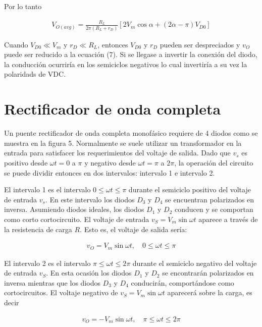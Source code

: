 \documentclass{article}
\begin{document}
Por lo tanto

\begin{align}
	V_{O(avg)} = \frac{R_L}{2\pi (R_L + r_D)} \left[ 2V_m \cos \alpha + (2\alpha - \pi)V_{D0} \right]
\end{align}

Cuando $V_{D0} \ll V_m$ y $r_D \ll R_L$, entonces $V_{D0}$ y $r_D$ pueden ser despreciados y $v_O$ puede ser reducido a la ecuación (7). Si se llegase a invertir la conexión del diodo, la conducción ocurriría en los semiciclos negativos lo cual invertiría a su vez la polaridads de VDC.

\section*{Rectificador de onda completa}
Un puente rectificador de onda completa monofásico requiere de 4 diodos como se muestra en la figura 5. Normalmente se suele utilizar un transformador en la entrada para satisfacer los requerimientos del voltaje de salida. Dado que $v_s$ es positivo desde $\omega t = 0$ a $\pi$ y negativo desde $\omega t = \pi$ a $2\pi$, la operación del circuito se puede dividir entonces en dos intervalos: intervalo 1 e intervalo 2.

El intervalo 1 es el intervalo $0 \leq \omega t \leq \pi$ durante el semiciclo positivo del voltaje de entrada $v_s$. En este intervalo los diodos $D_3$ y  $D_4$ se encuentran polarizados en inversa. Asumiendo diodos ideales, los diodos $D_1$ y $D_2$ conducen y se comportan como corto cortocircuito. El voltaje de entrada $v_S = V_m \sin \omega t$ aparece a través de la resistencia de carga $R$. Esto es, el voltaje de salida sería:

\begin{align}
	v_O = V_m \sin \omega t, \quad 0 \leq \omega t \leq \pi
\end{align}  

El intervalo 2 es el intervalo $\pi \leq \omega t \leq 2\pi$ durante el semiciclo negativo del voltaje de entrada $v_S$. En esta ocasión los diodos $D_1$ y $D_2$ se encontrarán polarizados en inversa mientras que los diodos $D_3$ y $D_4$ conducirán, comportándose como cortocircuitos. El voltaje negativo de $v_S = V_m \sin \omega t$ aparecerá sobre la carga, es decir

\begin{align}
	v_O = -V_m \sin \omega t, \quad \pi \leq \omega t \leq 2\pi
\end{align}
\end{document}
